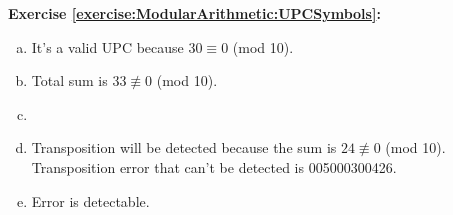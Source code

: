 \noindent\textbf{Exercise \ref{exercise:ModularArithmetic:UPCSymbols}:} %
\begin{enumerate}[(a)]
\item
It's a valid UPC because $30 \equiv 0$ (mod 10).
  
\item
Total sum is $33 \not\equiv 0$ (mod 10).

\item%

\item
Transposition will be detected because the sum is $24 \not\equiv 0$ (mod 10).\\
Transposition error that can't be detected is 005000300426.

\item
Error is detectable.


\end{enumerate}
